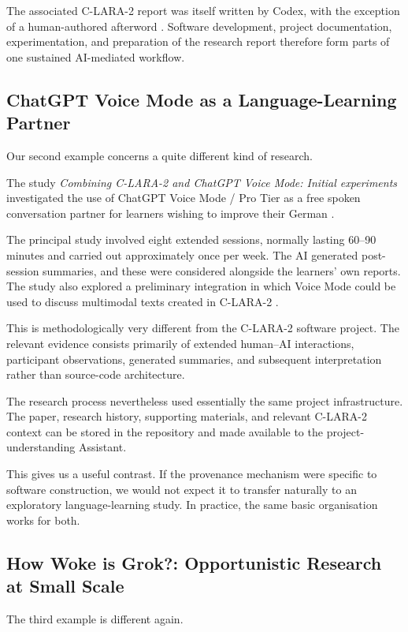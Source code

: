 The associated C-LARA-2 report was itself written by Codex, with the exception of a human-authored afterword \citep{bediEtAl2026clara2}. Software development, project documentation, experimentation, and preparation of the research report therefore form parts of one sustained AI-mediated workflow.


\subsection{ChatGPT Voice Mode as a Language-Learning Partner}

Our second example concerns a quite different kind of research.

The study \emph{Combining C-LARA-2 and ChatGPT Voice Mode: Initial experiments} investigated the use of ChatGPT Voice Mode / Pro Tier as a free spoken conversation partner for learners wishing to improve their German \citep{wrightEtAl2026voice}.

The principal study involved eight extended sessions, normally lasting 60--90 minutes and carried out approximately once per week. The AI generated post-session summaries, and these were considered alongside the learners' own reports. The study also explored a preliminary integration in which Voice Mode could be used to discuss multimodal texts created in C-LARA-2 \citep{wrightEtAl2026voice}.

This is methodologically very different from the C-LARA-2 software project. The relevant evidence consists primarily of extended human--AI interactions, participant observations, generated summaries, and subsequent interpretation rather than source-code architecture.

The research process nevertheless used essentially the same project infrastructure. The paper, research history, supporting materials, and relevant C-LARA-2 context can be stored in the repository and made available to the project-understanding Assistant.

This gives us a useful contrast. If the provenance mechanism were specific to software construction, we would not expect it to transfer naturally to an exploratory language-learning study. In practice, the same basic organisation works for both.


\subsection{How Woke is Grok?: Opportunistic Research at Small Scale}

The third example is different again.

